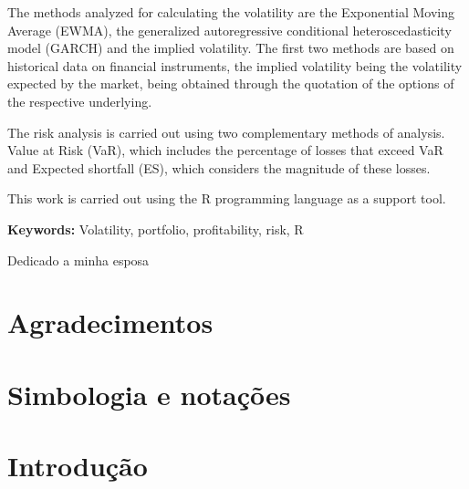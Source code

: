\documentclass[
  12pt,
  a4paper,
  openany]{book}
\begin{document}
The methods analyzed for calculating the volatility are the Exponential Moving Average (EWMA), the generalized autoregressive conditional heteroscedasticity model (GARCH) and the implied volatility. The first two methods are based on historical data on financial instruments, the implied volatility being the volatility expected by the market, being obtained through the quotation of the options of the respective underlying.

The risk analysis is carried out using two complementary methods of analysis. Value at Risk (VaR), which includes the percentage of losses that exceed VaR and Expected shortfall (ES), which considers the magnitude of these losses.

This work is carried out using the R programming language as a support tool.

\bigbreak

\noindent\textbf{Keywords:} Volatility, portfolio, profitability, risk, R

\newenvironment{dedication}
  {\clearpage           %
   \itshape             %
   \raggedleft          %
  }
  {\par %
   \vspace{\stretch{3}} %
   \clearpage           %
  }
\begin{dedication}
{\Large Dedicado a minha esposa\par}
\end{dedication}

\chapter*{Agradecimentos}

\renewcommand*\contentsname{Índice}
{
\setcounter{tocdepth}{2}
\tableofcontents
}
\listoftables
\listoffigures
{}
\hypertarget{simbologia-e-notauxe7uxf5es}{%
\chapter*{Simbologia e notações}\label{simbologia-e-notauxe7uxf5es}}

\mainmatter

\hypertarget{intro}{%
\chapter*{Introdução}\label{intro}}
\end{document}
